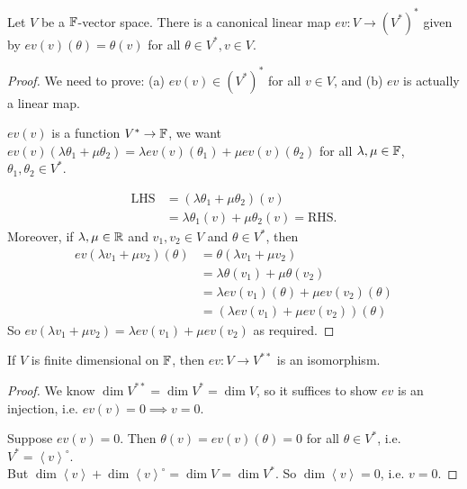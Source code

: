 \documentclass[a4paper]{article}
\begin{document}
\begin{lemma}
Let $V$ be a $\mathbb{F}$-vector space. There is a canonical linear map $ev:V \to \left(V^*\right)^*$ given by $ev\left(v\right)\left(\theta\right) = \theta\left(v\right)$ for all $\theta \in V^*,v \in V$.
\begin{proof}
We need to prove: (a) $ev\left(v\right) \in \left(V^*\right)^*$ for all $v \in V$, and (b) $ev$ is actually a linear map.

$ev\left(v\right)$ is a function $V^* \to \mathbb{F}$, we want $ev\left(v\right) \left(\lambda\theta_1+\mu\theta_2\right) = \lambda ev \left(v\right) \left(\theta_1\right) + \mu ev\left(v\right) \left(\theta_2\right)$ for all $\lambda,\mu \in \mathbb{F}$, $\theta_1,\theta_2 \in V^*$.

\begin{equation*}
\begin{aligned}
\text{LHS} &= \left(\lambda\theta_1+\mu\theta_2\right)\left(v\right)\\&= \lambda\theta_1\left(v\right) + \mu\theta_2\left(v\right) = \text{RHS}.
\end{aligned}
\end{equation*}
Moreover, if $\lambda,\mu \in \mathbb{R}$ and $v_1,v_2 \in V$ and $\theta \in V^*$, then
\begin{equation*}
\begin{aligned}
ev\left(\lambda v_1 + \mu v_2\right)\left(\theta\right) &= \theta\left(\lambda v_1+\mu v_2\right) \\
&= \lambda\theta\left(v_1\right)+\mu\theta\left(v_2\right) \\
&= \lambda ev\left(v_1\right)\left(\theta\right) + \mu ev\left(v_2\right)\left(\theta\right) \\
&= \left(\lambda ev\left(v_1\right) + \mu ev\left(v_2\right)\right)\left(\theta\right)
\end{aligned}
\end{equation*}
So $ev\left(\lambda v_1+\mu v_2\right) = \lambda ev\left(v_1\right) + \mu ev\left(v_2\right)$ as required.
\end{proof}
\end{lemma}

\begin{lemma}
If $V$ is finite dimensional on $\mathbb{F}$, then $ev: V \to V^{**}$ is an isomorphism.
\begin{proof}
We know $\dim V^{**} = \dim V^* = \dim V$, so it suffices to show $ev$ is an injection, i.e. $ev\left(v\right) = 0 \implies v = 0$.

Suppose $ev\left(v\right) = 0$. Then $\theta\left(v\right) = ev\left(v\right)\left(\theta\right) = 0$ for all $\theta \in V^*$, i.e. $V^* = \left<v\right>^\circ$.\\
But $\dim\left<v\right> + \dim\left<v\right>^\circ = \dim V = \dim V^*$. So $\dim\left<v\right> = 0$, i.e. $v=0$.
\end{proof}
\end{lemma}
\end{document}
